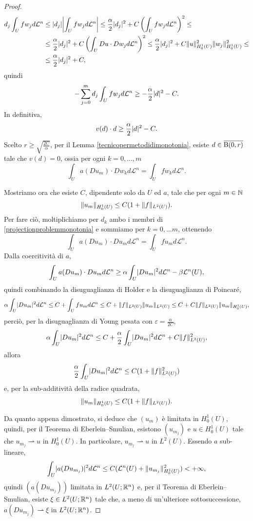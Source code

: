 \begin{proof}
	\begin{align*}
		d_j  \int_U fw_jd\mathcal{L}^n &\le \abs{d_j} \abs*{ \int_U fw_jd\mathcal{L}^n}\le \frac{\alpha}{2} \abs{d_j}^2 + C \left( \int_U fw_j d\mathcal{L}^n\right) ^2 \le \\
		&\le \frac{\alpha}{2} \abs{d_j}^2 + C\left( \int_U Du \cdot Dw_j d\mathcal{L}^n\right) ^2 \le \frac{\alpha}{2} \abs{d_j}^2 + C\norm{u}_{H^1_0(U)}^2\norm{w_j}_{H^1_0(U)}^2 \le \\
		&\le \frac{\alpha}{2} \abs{d_j}^2 + C, 
	\end{align*}
	quindi
	\[ - \sum_{j=0}^{m} d_j \int_U fw_jd\mathcal{L}^n \ge -\frac{\alpha}{2} \lvert d\rvert^2 - C. \]
	In definitiva, 
	\[ v(d) \cdot d \ge  \frac{\alpha}{2} \lvert d\rvert^2 - C.\]
	Scelto $r\ge \sqrt{\frac{2C}{\alpha}}$, per il Lemma \eqref{tecnicopermetodidimonotonia}, esiste $d \in \overline{\textup{B}(0,r)}$ tale che $v(d) = 0$, ossia per ogni $k = 0,\dots, m$
	\begin{equation}\label{projectionproblemmonotonia}
		\int_U a(Du_m)\cdot Dw_k d\mathcal{L}^n = \int_U fw_k d\mathcal{L}^n.
	\end{equation}
	
	Mostriamo ora che esiste $C$, dipendente solo da $U$ ed $a$, tale che per ogni $m \in \mathbb{N}$
	\[ \lVert u_m\rVert_{H^1_0(U)} \le C(1+\lVert f\rVert_{L^2(U)}). \]
	Per fare ciò, moltiplichiamo per $d_k$ ambo i membri di \eqref{projectionproblemmonotonia} e sommiamo per $k=0,\dots m$, ottenendo
	\begin{equation}\label{miserve}
		\int_U a(Du_m) \cdot Du_m d\mathcal{L}^n = \int_U fu_m d\mathcal{L}^n.
	\end{equation}
	Dalla coercitività di $a$, 
	\[ \int_U a(Du_m) \cdot Du_m d\mathcal{L}^n \ge \alpha \int_U \lvert Du_m\rvert^2d\mathcal{L}^n -\beta \mathcal{L}^n(U), \]
	quindi combinando la disuguaglianza di Holder e la disuguaglianza di Poincaré,
	\[ \alpha \int_U \lvert Du_m\rvert^2d\mathcal{L}^n \le C +\int_U fu_m d\mathcal{L}^n \le C +\lVert f\rVert_{L^2(U)}\lVert u_m\rVert_{L^2(U)} \le C+C\lVert f\rVert_{L^2(U)}\lVert u_m\rVert_{H^1_0(U)}, \]
	perciò, per la disuguaglianza di Young pesata con $\varepsilon = \frac{\alpha}{2C}$,
	\[ \alpha \int_U \lvert Du_m\rvert^2d\mathcal{L}^n \le C + \frac{\alpha}{2} \int_U \lvert Du_m\rvert^2d\mathcal{L}^n +C\lVert f\rVert_{L^2(U)}^2, \]
	allora
	\[ \frac{\alpha}{2} \int_U \lvert Du_m\rvert^2d\mathcal{L}^n \le C(1 + \lVert f\rVert_{L^2(U)}^2) \]
	e, per la sub-additività della radice quadrata,
	\[ \lVert u_m\rVert_{H^1_0(U)} \le C(1+\lVert f\rVert_{L^2(U)}). \]
	
	Da quanto appena dimostrato, si deduce che $(u_m)$ è limitata in $H^1_0(U)$, quindi, per il Teorema di Eberlein--Smulian, esistono $(u_{m_j})$ e $u\in H^1_0(U)$ tale che $u_{m_j} \rightharpoonup u$ in $H^1_0(U)$. %
	In particolare, $u_{m_j} \rightharpoonup u$ in $L^2(U)$. Essendo $a$ sub-lineare, 
	\[ \int_U \lvert a(Du_{m_j})\rvert^2 d\mathcal{L}^n \le C(\mathcal{L}^n(U) + \lVert u_{m_j}\rVert_{H^1_0(U)}^2)<+\infty, \]
	quindi $(a(Du_{m_j}))$ limitata in $L^2(U;\mathbb{R}^n)$ e, per il Teorema di Eberlein--Smulian, esiste $\xi \in L^2(U;\mathbb{R}^n)$ tale che, a meno di un'ulteriore sottosuccessione, $a(Du_{m_j}) \rightharpoonup \xi$ in $L^2(U;\mathbb{R}^n)$. 
	

\end{proof}
